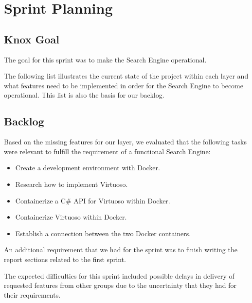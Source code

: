 
\section{Sprint Planning}
\subsection*{Knox Goal}
The goal for this sprint was to make the Search Engine operational.

The following list illustrates the current state of the \knox{} project within each layer and what features need to be implemented in order for the Search Engine to become operational. This list is also the basis for our backlog.



\subsection*{Backlog}
Based on the missing features for our layer, we evaluated that the following tasks were relevant to fulfill the requirement of a functional Search Engine:
\begin{itemize}
    \item Create a development environment with Docker.
    \item Research how to implement Virtuoso.
    \item Containerize a C\# API for Virtuoso within Docker.
    \item Containerize Virtuoso within Docker.
    \item Establish a connection between the two Docker containers.
\end{itemize}

An additional requirement that we had for the sprint was to finish writing the report sections related to the first \knox{} sprint.

The expected difficulties for this sprint included possible delays in delivery of requested features from other groups due to the uncertainty that they had for their requirements. 
